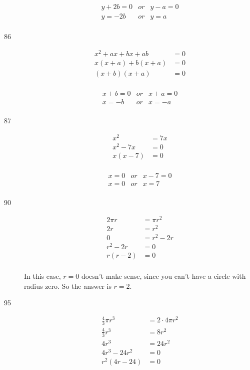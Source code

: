\documentclass[letterpaper]{exam}
\begin{document}
\begin{description}
      \begin{align*}
        y + 2b = 0 &or& y - a = 0 \\
        y = -2b &or& y = a \\
      \end{align*}

      \item[86]
      \begin{align*}
        x^2 + ax + bx + ab &= 0 \\
        x(x + a) + b(x + a) &= 0 \\
        (x + b)(x + a) &= 0 \\
      \end{align*}

      \begin{align*}
        x + b = 0 &or& x + a = 0 \\
        x = -b &or& x = -a \\
      \end{align*}

      \item[87]
      \begin{align*}
        x^2 &= 7x \\
        x^2 - 7x &= 0 \\
        x(x - 7) &= 0 \\
      \end{align*}

      \begin{align*}
        x = 0 &or& x - 7 = 0 \\
        x = 0 &or& x = 7 \\
      \end{align*}

      \item[90]
      \begin{align*}
        2 \pi r &= \pi r^2 \\
        2r &= r^2 \\
        0 &= r^2 - 2r \\
        r^2 - 2r &= 0 \\
        r(r - 2) &= 0 \\
      \end{align*}

      In this case, $r = 0$ doesn't make sense, since you can't have a circle with radius zero.  So the answer is 
      $r = 2$.

      \item[95]
      \begin{align*}
        \frac{4}{3} \pi r^3 &= 2 \cdot 4 \pi r^2 \\
        \frac{4}{3} r^3 &= 8r^2 \\
        4r^3 &= 24r^2 \\
        4r^3 - 24r^2 &= 0 \\
        r^2(4r - 24) &= 0 \\
      \end{align*}


\end{description}
\end{document}
